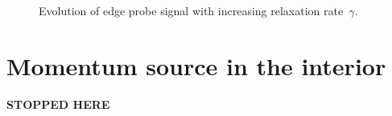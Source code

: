 \documentclass[preprint,aps,eqsecnum]{revtex4-1}
\begin{document}
\begin{figure}
  \def\svgwidth{0.5\textwidth}
  
  \caption{
    \label{fig:flux-vs-gamma-h}
    Evolution of edge probe signal with increasing relaxation rate~$\gamma$.
  }
\end{figure}
%  



\section{Momentum source in the interior}
\label{sec:stokeslet}

{\bf STOPPED HERE}
\end{document}
